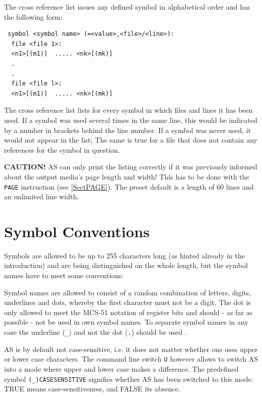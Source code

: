 \documentclass[12pt,twoside]{report}
\newcommand{\bb}[1]{{\bf #1}}
\newcommand{\tty}[1]{{\tt #1}}
\newcommand{\asname}{{AS}}
\newcommand{\predefsym}[1]{{\tt (\_)#1}}
\begin{document}
The cross reference list issues any defined symbol in alphabetical
order and has the following form:
\begin{verbatim}
 symbol <symbol name> (=<value>,<file>/<line>):
  file <file 1>:
  <n1>[(m1)]  ..... <nk>[(mk)]
  .
  .
  file <file l>:
  <n1>[(m1)]  ..... <nk>[(mk)]
\end{verbatim}
The cross reference list lists for every symbol in which files and lines
it has been used.  If a symbol was used several times in the same line,
this would be indicated by a number in brackets behind the line number.
If a symbol was never used, it would not appear in the list; The same is
true for a file that does not contain any references for the symbol in
question.

\bb{CAUTION!}  \asname{} can only print the listing correctly if it was
previously informed about the output media's page length and width!
This has to be done with the \tty{PAGE} instruction (see \ref{SectPAGE}).  The
preset default is a length of 60 lines and an unlimited line width.


\section{Symbol Conventions}
\label{SectSymConv}

Symbols are allowed to be up to 255 characters long (as hinted already
in the introduction) and are being distinguished on the whole
length, but the symbol names have to meet some conventions:

Symbol names are allowed to consist of a random combination of
letters, digits, underlines and dots, whereby the first character must
not be a digit. The dot is only allowed to meet the MCS-51 notation of
register bits and should - as far as possible - not be used in own symbol
names.  To separate symbol names in any case the underline (\tty{\_}) and not
the dot (\tty{.}) should be used .

\asname{} is by default not case-sensitive, i.e. it does not matter whether
one uses upper or lower case characters.  The command line switch \tty{U}
however allows to switch \asname{} into a mode where upper and lower case
makes a difference.  The predefined symbol \predefsym{CASESENSITIVE} signifies
whether \asname{} has been switched to this mode: TRUE means case-sensitiveness,
and FALSE its absence.
\end{document}
